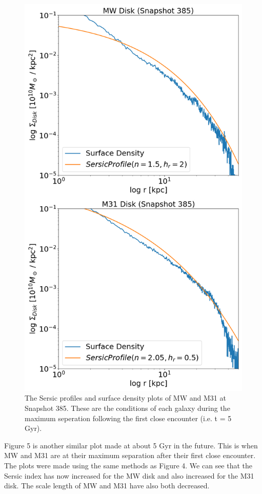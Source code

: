 \documentclass[linenumbers,trackchanges,twocolumn]{aastex7}
\begin{document}
\begin{figure}[h!]
\centering
\includegraphics[scale=0.2]{ResultsV_385.jpg}
\caption{The Sersic profiles and surface density plots of MW and M31 at Snapshot 385. These are the conditions of each galaxy during the maximum seperation following the first close encounter (i.e. t = 5 Gyr).
\label{fig:general}}
\end{figure}

Figure 5 is another similar plot made at about 5 Gyr in the future.
This is when MW and M31 are at their maximum separation after their
first close encounter. The plots were made using the same methods as
Figure  4. We can see that the Sersic index has now increased
for the MW disk and also increased for the M31 disk. The scale length of
MW and M31 have also both decreased.
\end{document}
